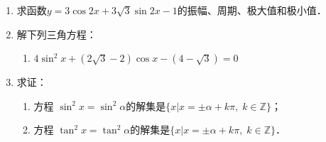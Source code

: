 \begin{enumerate}
\item 求函数$y=3\cos 2x+3\sqrt{3}\sin 2x-1$的振幅、周期、极大值和极小值．
\item 解下列三角方程：
 \begin{enumerate}
\item $4\sin ^{2} x+(2 \sqrt{3}-2) \cos x-(4-\sqrt{3})=0$
\end{enumerate}   

\item 求证：
\begin{enumerate}
    \item 方程 $\sin^2x=\sin^2\alpha$的解集是$\{x|x=\pm \alpha+k\pi,\; k\in\mathbb{Z}\}$；
    \item 方程 $\tan^2x=\tan^2\alpha$的解集是$\{x|x=\pm \alpha+k\pi,\; k\in\mathbb{Z}\}$．
\end{enumerate}
\end{enumerate}